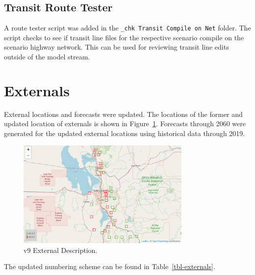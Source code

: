 \documentclass[
  letterpaper,
  DIV=11,
  numbers=noendperiod]{scrreprt}
\begin{document}
\hypertarget{transit-route-tester}{%
\subsection{Transit Route Tester}\label{transit-route-tester}}

A route tester script was added in the
\texttt{\_chk\ Transit\ Compile\ on\ Net} folder. The script checks to
see if transit line files for the respective scenario compile on the
scenario highway network. This can be used for reviewing transit line
edits outside of the model stream.

\hypertarget{externals}{%
\section{Externals}\label{externals}}

External locations and forecasts were updated. The locations of the
former and updated location of externals is shown in
Figure~\ref{fig-externals-pdf}. Forecasts through 2060 were generated
for the updated external locations using historical data through 2019.

\begin{figure}[H]

{\centering \includegraphics[width=0.76\textwidth,height=\textheight]{v9x/v900/whats-new/_pictures/externals.png}

}

\caption{\label{fig-externals-pdf}v9 External Description.}

\end{figure}

The updated numbering scheme can be found in Table~\ref{tbl-externals}.
\end{document}
